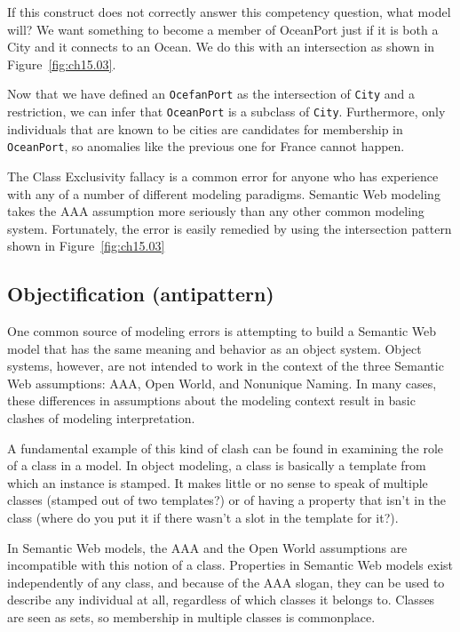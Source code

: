 If this construct does not correctly answer this competency question,
what model will? We want something to become a member of OceanPort just
if it is both a City and it connects to an Ocean. We do this with an
intersection as shown in Figure~\ref{fig:ch15.03}.

Now that we have defined an \texttt{OcefanPort} as the intersection of \texttt{City} and a
restriction, we can infer that \texttt{OceanPort} is a subclass of \texttt{City}.
Furthermore, only individuals that are known to be cities are candidates
for membership in \texttt{OceanPort}, so anomalies like the previous one for
France cannot happen.

The Class Exclusivity fallacy is a common error for anyone who has
experience with any of a number of different modeling paradigms.
Semantic Web modeling takes the AAA assumption more seriously than any
other common modeling system. Fortunately, the error is easily remedied
by using the intersection pattern shown in Figure~\ref{fig:ch15.03}

\subsection{Objectification (antipattern)}

One common source of modeling errors is attempting to build a Semantic
Web model that has the same meaning and behavior as an object system.
Object systems, however, are not intended to work in the context of the
three Semantic Web assumptions: AAA, Open World, and Nonunique Naming.
In many cases, these differences in assumptions about the modeling
context result in basic clashes of modeling interpretation.

A fundamental example of this kind of clash can be found in examining
the role of a class in
a model. In object modeling, a class is basically a template from which
an instance is stamped. It makes little or no sense to speak of multiple
classes (stamped out of two templates?) or of having a property that
isn't in the class (where do you put it if there wasn't a slot in the
template for it?).

In Semantic Web models, the AAA and the Open World assumptions are
incompatible with this notion of a class. Properties in Semantic Web
models exist independently of any class, and because of the AAA slogan,
they can be used to describe any individual at all, regardless of which
classes it belongs to. Classes are seen as sets, so membership in
multiple classes is commonplace.

